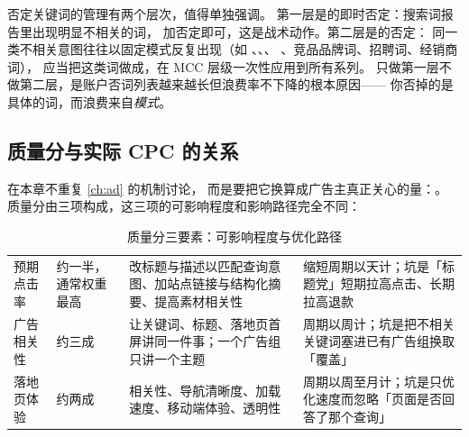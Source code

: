 否定关键词的管理有两个层次，值得单独强调。
第一层是的即时否定：搜索词报告里出现明显不相关的词，
加否定即可，这是战术动作。第二层是的否定：
同一类不相关意图往往以固定模式反复出现（如 、、、
、竞品品牌词、招聘词、经销商词），
应当把这类词做成，在 MCC 层级一次性应用到所有系列。
只做第一层不做第二层，是账户否词列表越来越长但浪费率不下降的根本原因——
你否掉的是具体的词，而浪费来自\emph{模式}。

\subsection{质量分与实际 CPC 的关系}

 在本章不重复 \cref{ch:ad} 的机制讨论，
而是要把它换算成广告主真正关心的量：。
质量分由三项构成，这三项的可影响程度和影响路径完全不同：

\begin{table}[htbp]
\centering
\caption{质量分三要素：可影响程度与优化路径}
\label{tab:g-qs}
\small
\begin{tabularx}{\textwidth}{L{2.3cm} L{2.6cm} L{3.3cm} Y}
\toprule
{} &  &  &  \\
\midrule
预期点击率 & 约一半，通常权重最高 & 改标题与描述以匹配查询意图、加站点链接与结构化摘要、提高素材相关性 & 缩短周期以天计；坑是「标题党」短期拉高点击、长期拉高退款 \\
\addlinespace
广告相关性 & 约三成 & 让关键词、标题、落地页首屏讲同一件事；一个广告组只讲一个主题 & 周期以周计；坑是把不相关关键词塞进已有广告组换取「覆盖」 \\
\addlinespace
落地页体验 & 约两成 & 相关性、导航清晰度、加载速度、移动端体验、透明性 & 周期以周至月计；坑是只优化速度而忽略「页面是否回答了那个查询」 \\
\bottomrule
\end{tabularx}
\end{table}

